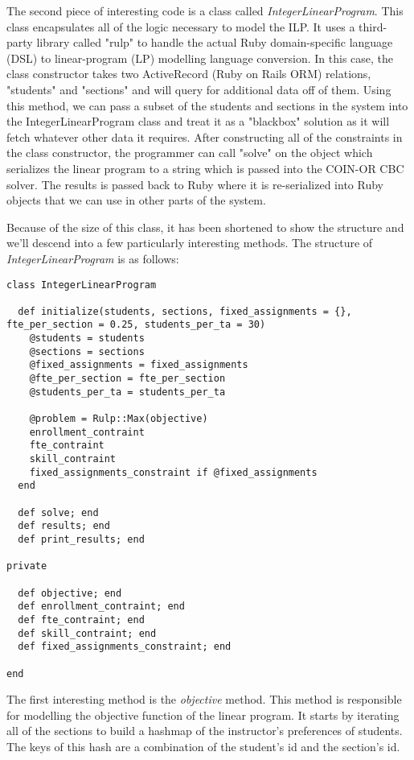 The second piece of interesting code is a class called \textit{IntegerLinearProgram}.
This class encapsulates all of the logic necessary to model the ILP.
It uses a third-party library called "rulp" to handle the actual Ruby domain-specific language (DSL) to linear-program (LP) modelling language conversion.
In this case, the class constructor takes two ActiveRecord (Ruby on Rails ORM) relations, "students" and "sections" and will query for additional data off of them.
Using this method, we can pass a subset of the students and sections in the system into the IntegerLinearProgram class and treat it as a "blackbox" solution as it will fetch whatever other data it requires.
After constructing all of the constraints in the class constructor, the programmer can call "solve" on the object which serializes the linear program to a string which is passed into the COIN-OR CBC solver.
The results is passed back to Ruby where it is re-serialized into Ruby objects that we can use in other parts of the system.

Because of the size of this class, it has been shortened to show the structure and we'll descend into a few particularly interesting methods. The structure of \textit{IntegerLinearProgram} is as follows:

\begin{lstlisting}
class IntegerLinearProgram

  def initialize(students, sections, fixed_assignments = {}, fte_per_section = 0.25, students_per_ta = 30)
    @students = students
    @sections = sections
    @fixed_assignments = fixed_assignments
    @fte_per_section = fte_per_section
    @students_per_ta = students_per_ta

    @problem = Rulp::Max(objective)
    enrollment_contraint
    fte_contraint
    skill_contraint
    fixed_assignments_constraint if @fixed_assignments
  end

  def solve; end
  def results; end
  def print_results; end

private

  def objective; end
  def enrollment_contraint; end
  def fte_contraint; end
  def skill_contraint; end
  def fixed_assignments_constraint; end

end
\end{lstlisting}

The first interesting method is the \textit{objective} method.
This method is responsible for modelling the objective function of the linear program.
It starts by iterating all of the sections to build a hashmap of the instructor's preferences of students.
The keys of this hash are a combination of the student's id and the section's id.

